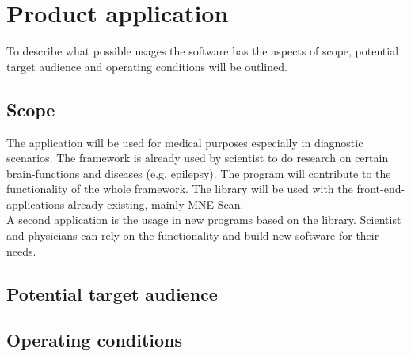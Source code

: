 \section{Product application}
To describe what possible usages the software has the aspects of scope, potential target audience and operating conditions will be outlined. 
\subsection{Scope}
The application will be used for medical purposes especially in diagnostic scenarios. The framework is already used by scientist to do research on certain brain-functions and diseases (e.g. epilepsy). The program  will contribute to the functionality of the whole framework. The library will be used with the front-end-applications already existing, mainly MNE-Scan.\\
A second application is the usage in new programs based on the library. Scientist and physicians can rely on the functionality and build new software for their needs.


\subsection{Potential target audience}
\subsection{Operating conditions}